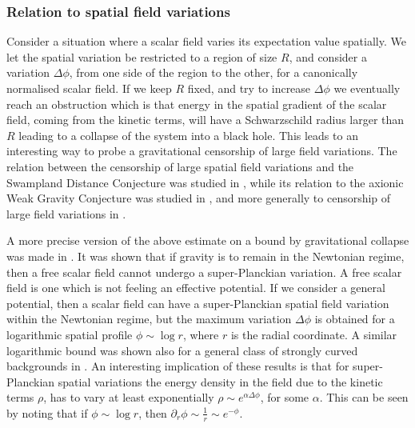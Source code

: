 \documentclass[11pt,a4paper]{article}
\numberwithin{equation}{section}
\numberwithin{table}{section}\setlength{\multlinegap}{25pt}
\begin{document}
\subsubsection{Relation to spatial field variations}
\label{sec:spatfv}

Consider a situation where a scalar field varies its expectation value spatially. We let the spatial variation be restricted to a region of size $R$, and consider a variation $\Delta \phi$, from one side of the region to the other, for a canonically normalised scalar field. If we keep $R$ fixed, and try to increase $\Delta \phi$ we eventually reach an obstruction which is that energy in the spatial gradient of the scalar field, coming from the kinetic terms, will have a Schwarzschild radius larger than $R$ leading to a collapse of the system into a black hole. This leads to an interesting way to probe a gravitational censorship of large field variations. The relation between the censorship of large spatial field variations and the Swampland Distance Conjecture was studied in \cite{Klaewer:2016kiy}, while its relation to the axionic Weak Gravity Conjecture was studied in \cite{Dolan:2017vmn}, and more generally to censorship of large field variations in \cite{Draper:2019zbb}.  

A more precise version of the above estimate on a bound by gravitational collapse was made in \cite{Nicolis:2008wh}. It was shown that if gravity is to remain in the Newtonian regime, then a free scalar field cannot undergo a super-Planckian variation. A free scalar field is one which is not feeling an effective potential. If we consider a general potential, then a scalar field can have a super-Planckian spatial field variation within the Newtonian regime, but the maximum variation $\Delta \phi$ is obtained for a logarithmic spatial profile $\phi \sim \log r$, where $r$ is the radial coordinate. A similar logarithmic bound was shown also for a general class of strongly curved backgrounds in \cite{Klaewer:2016kiy}. An interesting implication of these results is that for super-Planckian spatial variations the energy density in the field due to the kinetic terms $\rho$, has to vary at least exponentially $\rho \sim e^{\alpha \Delta \phi}$, for some $\alpha$. This can be seen by noting that if $\phi \sim \log r$, then $\partial_r \phi \sim \frac{1}{r} \sim e^{-\phi}$. 
\end{document}
